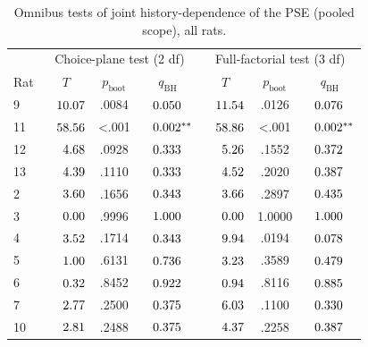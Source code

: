 \begin{table}[htbp]
\centering
\caption{Omnibus tests of joint history-dependence of the PSE (pooled scope), all rats.}
\label{tab:omnibus_2df_3df}
\begin{tabular}{lcccccc}
\toprule
 & \multicolumn{3}{c}{Choice-plane test (2 df)} & \multicolumn{3}{c}{Full-factorial test (3 df)} \\
Rat & $T$ & $p_{\mathrm{boot}}$ & $q_{\mathrm{BH}}$ & $T$ & $p_{\mathrm{boot}}$ & $q_{\mathrm{BH}}$ \\
\midrule
9 & $\hphantom{-}10.07$ & .0084 & $\hphantom{-}0.050^{\hphantom{**}}$ & $\hphantom{-}11.54$ & .0126 & $\hphantom{-}0.076^{\hphantom{**}}$ \\
11 & $\hphantom{-}58.56$ & <.001 & $\hphantom{-}0.002^{**}$ & $\hphantom{-}58.86$ & <.001 & $\hphantom{-}0.002^{**}$ \\
12 & $\hphantom{-}\hphantom{0}4.68$ & .0928 & $\hphantom{-}0.333^{\hphantom{**}}$ & $\hphantom{-}\hphantom{0}5.26$ & .1552 & $\hphantom{-}0.372^{\hphantom{**}}$ \\
13 & $\hphantom{-}\hphantom{0}4.39$ & .1110 & $\hphantom{-}0.333^{\hphantom{**}}$ & $\hphantom{-}\hphantom{0}4.52$ & .2020 & $\hphantom{-}0.387^{\hphantom{**}}$ \\
\midrule
2 & $\hphantom{-}\hphantom{0}3.60$ & .1656 & $\hphantom{-}0.343^{\hphantom{**}}$ & $\hphantom{-}\hphantom{0}3.66$ & .2897 & $\hphantom{-}0.435^{\hphantom{**}}$ \\
3 & $\hphantom{-}\hphantom{0}0.00$ & .9996 & $\hphantom{-}1.000^{\hphantom{**}}$ & $\hphantom{-}\hphantom{0}0.00$ & 1.0000 & $\hphantom{-}1.000^{\hphantom{**}}$ \\
4 & $\hphantom{-}\hphantom{0}3.52$ & .1714 & $\hphantom{-}0.343^{\hphantom{**}}$ & $\hphantom{-}\hphantom{0}9.94$ & .0194 & $\hphantom{-}0.078^{\hphantom{**}}$ \\
5 & $\hphantom{-}\hphantom{0}1.00$ & .6131 & $\hphantom{-}0.736^{\hphantom{**}}$ & $\hphantom{-}\hphantom{0}3.23$ & .3589 & $\hphantom{-}0.479^{\hphantom{**}}$ \\
6 & $\hphantom{-}\hphantom{0}0.32$ & .8452 & $\hphantom{-}0.922^{\hphantom{**}}$ & $\hphantom{-}\hphantom{0}0.94$ & .8116 & $\hphantom{-}0.885^{\hphantom{**}}$ \\
7 & $\hphantom{-}\hphantom{0}2.77$ & .2500 & $\hphantom{-}0.375^{\hphantom{**}}$ & $\hphantom{-}\hphantom{0}6.03$ & .1100 & $\hphantom{-}0.330^{\hphantom{**}}$ \\
10 & $\hphantom{-}\hphantom{0}2.81$ & .2488 & $\hphantom{-}0.375^{\hphantom{**}}$ & $\hphantom{-}\hphantom{0}4.37$ & .2258 & $\hphantom{-}0.387^{\hphantom{**}}$ \\

\end{tabular}
\end{table}
